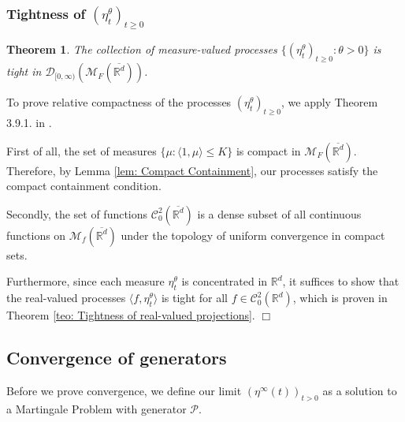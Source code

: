 \documentclass[12pt]{article}
\newenvironment {proof}{{\noindent\bf Proof }}{\hfill $\Box$ \medskip}
\newtheorem{theorem}{Theorem}[section]
\newcommand{\Pgen}{\mathcal{P}}    %
\begin{document}
\subsubsection{Tightness of $(\eta^{\theta}_t)_{t \geq 0}$}
\begin{theorem}
The collection of measure-valued processes 
$\{(\eta^{\theta}_t)_{t \geq 0}: \theta > 0\}$
is tight in $\mathcal{D}_{[0,\infty)}(\mathcal{M}_F(\overline{\mathbb{R}^d}))$.
\end{theorem}
\begin{proof}
To prove relative compactness 
of the processes $(\eta^{\theta}_t)_{t \geq 0}$,
we apply Theorem 3.9.1. in \cite{EK}.

First of all, the set of measures 
$\{ \mu: \langle 1, \mu \rangle \leq K \} $
is compact in $\mathcal{M}_F(\overline{\mathbb{R}^d})$.
Therefore, by Lemma \ref{lem: Compact Containment},
our processes satisfy the compact containment condition.

Secondly, the set of functions $\mathcal{C}^{2}_{0}(\overline{\mathbb{R}^d})$ is a dense subset of all continuous functions on $\mathcal{M}_f(\overline{\mathbb{R}^d})$
under the topology of uniform convergence in compact sets.

Furthermore,
since each measure $\eta^{\theta}_t$ is concentrated in $\mathbb{R}^d$,
it suffices to show that the real-valued processes
$\langle f, \eta^{\theta}_t \rangle$
is tight for all $f \in \mathcal{C}^{2}_{0}(\mathbb{R}^d)$,
which is proven in
Theorem \ref{teo: Tightness of real-valued projections}.
\end{proof}

\subsection{Convergence of generators}
    \label{sec:population_generators_proofs}

Before we prove convergence, we define our limit $(\eta^{\infty}(t))_{t>0}$ as a solution to a Martingale Problem with generator $\Pgen$.
\end{document}
